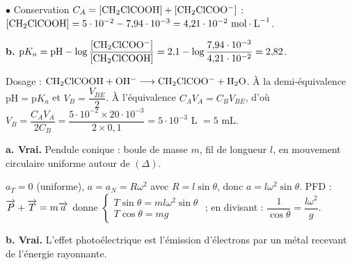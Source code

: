 \documentclass[11pt]{article}
\begin{document}
$\bullet$ Conservation $C_A = [\mathrm{CH_2ClCOOH}] + [\mathrm{CH_2ClCOO^-}]$ : $[\ch{CH_2ClCOOH}] = 5\cdot10^{-2} - 7{,}94\cdot10^{-3} = 4{,}21\cdot10^{-2}\ \text{mol}\cdot\text{L}^{-1}$.

\textbf{b.} $\text{p}K_a = \text{pH} - \log\dfrac{[\mathrm{CH_2ClCOO^-}]}{[\mathrm{CH_2ClCOOH}]} = 2{,}1 - \log\dfrac{7{,}94\cdot10^{-3}}{4{,}21\cdot10^{-2}} = 2{,}82$.

 Dosage : $\mathrm{CH_2ClCOOH + OH^- \longrightarrow CH_2ClCOO^- + H_2O}$. À la demi-équivalence $\text{pH} = \text{p}K_a$ et $V_B = \dfrac{V_{BE}}{2}$. À l'équivalence $C_A V_A = C_B V_{BE}$, d'où $V_B = \dfrac{C_A V_A}{2C_B} = \dfrac{5\cdot10^{-2}\times 20\cdot10^{-3}}{2\times 0{,}1} = 5\cdot10^{-3}$ L $= 5$ mL.


\textbf{a. Vrai.} Pendule conique : boule de masse $m$, fil de longueur $l$, en mouvement circulaire uniforme autour de $(\Delta)$.
\begin{center}
\end{center}
$a_T = 0$ (uniforme), $a = a_N = R\omega^2$ avec $R = l\sin\theta$, donc $a = l\omega^2\sin\theta$. PFD : $\overrightarrow{P} + \overrightarrow{T} = m\overrightarrow{a}$ donne $\begin{cases} T\sin\theta = ml\omega^2\sin\theta \\ T\cos\theta = mg \end{cases}$ ; en divisant : $\dfrac{1}{\cos\theta} = \dfrac{l\omega^2}{g}$.

\textbf{b. Vrai.} L'effet photoélectrique est l'émission d'électrons par un métal recevant de l'énergie rayonnante.
\end{document}
